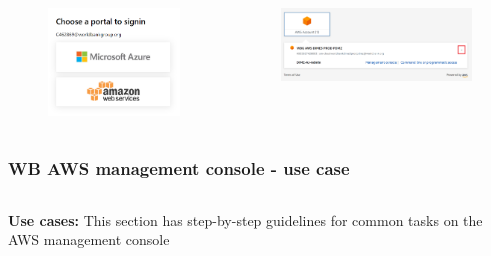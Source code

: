 \documentclass[aspectratio=169]{beamer} %
\begin{document}
\begin{frame}
\begin{columns}[c]
		\begin{figure}
			\centering
			\includegraphics[width=.5\textwidth]{./img/logon-1.png}
		\end{figure}
		\vspace{.2cm}
		\begin{figure}
			\centering
			\includegraphics[width=1\textwidth]{./img/logon-2.png}
		\end{figure}
	\end{columns}
\end{frame}

\begin{frame}
	\frametitle{WB AWS management console - use case}
	\begin{columns}[c]
		
		
		\textbf{Use cases:} This section has step-by-step guidelines for common tasks on the AWS management console
		
	\end{columns}
\end{frame}
\end{document}
